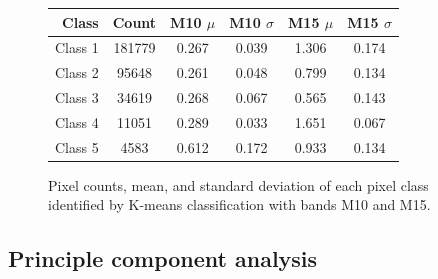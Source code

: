 \documentclass[12pt]{article}
\begin{document}
\begin{figure}[h!]
    \centering
    \begin{tabular}{r | C | C C | C C |}
        Class & \textnormal{Count} & \textnormal{M10 $\mu$} & \textnormal{M10 $\sigma$} & \textnormal{M15 $\mu$} & \textnormal{M15 $\sigma$} \\
        \hline
        Class 1 & 181779 & 0.267 & 0.039 & 1.306 & 0.174 \\
        Class 2 & 95648 & 0.261 & 0.048 & 0.799 & 0.134 \\
        Class 3 & 34619 & 0.268 & 0.067 & 0.565 & 0.143 \\
        Class 4 & 11051 & 0.289 & 0.033 & 1.651 & 0.067 \\
        Class 5 & 4583 & 0.612 & 0.172 & 0.933 & 0.134 \\
    \end{tabular}
    \caption{Pixel counts, mean, and standard deviation of each pixel class identified by K-means classification with bands M10 and M15.}
\end{figure}

\clearpage

\subsection{Principle component analysis}
\end{document}
